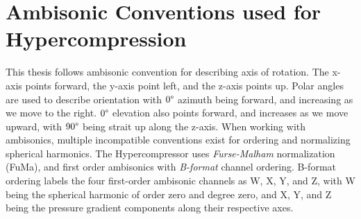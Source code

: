 \section{Ambisonic Conventions used for Hypercompression}
\label{sec:ambis-conv-used}
This thesis follows ambisonic convention for describing axis of
rotation. The x-axis points forward, the y-axis point left, and the
z-axis points up. Polar angles are used to describe orientation with
$0\degree$ azimuth being forward, and increasing as we move to the
right. $0\degree$ elevation also points forward, and increases as we
move upward, with $90\degree$ being strait up along the z-axis. When
working with ambisonics, multiple incompatible conventions exist for
ordering and normalizing spherical harmonics.\cite{Nachbar2011} The
Hypercompressor uses \textit{Furse-Malham} normalization
(FuMa)\cite{Malham2003}, and first order ambisonics with
\textit{B-format}\cite{Hollerweger2008} channel ordering. B-format
ordering labels the four first-order ambisonic channels as W, X, Y,
and Z, with W being the spherical harmonic of order zero and degree zero,
and X, Y, and Z being the pressure gradient components along their
respective axes. 

